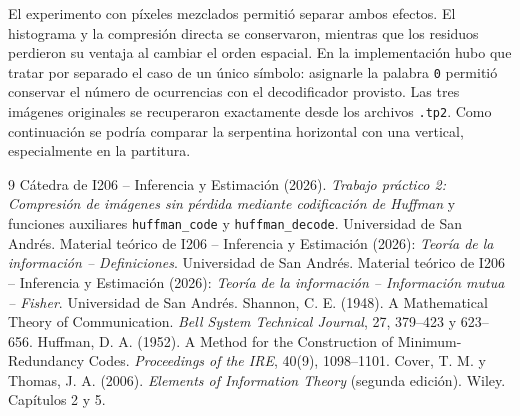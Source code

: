 \documentclass[11pt,a4paper]{article}
\begin{document}
El experimento con píxeles mezclados permitió separar ambos efectos. El histograma y la compresión directa
se conservaron, mientras que los residuos perdieron su ventaja al cambiar el orden espacial. En la
implementación hubo que tratar por separado el caso de un único símbolo: asignarle la palabra
\texttt{0} permitió conservar el número de ocurrencias con el decodificador provisto. Las tres
imágenes originales se recuperaron exactamente desde los archivos \texttt{.tp2}. Como continuación
se podría comparar la serpentina horizontal con una vertical, especialmente en la partitura.

{\small
\begin{thebibliography}{9}
 Cátedra de I206 -- Inferencia y Estimación (2026). \emph{Trabajo práctico 2: Compresión
  de imágenes sin pérdida mediante codificación de Huffman} y funciones auxiliares
  \texttt{huffman\_code} y \texttt{huffman\_decode}. Universidad de San Andrés.
 Material teórico de I206 -- Inferencia y Estimación (2026): \emph{Teoría de la
  información -- Definiciones}. Universidad de San Andrés.
 Material teórico de I206 -- Inferencia y Estimación (2026): \emph{Teoría de la
  información -- Información mutua -- Fisher}. Universidad de San Andrés.
 Shannon, C. E. (1948). A Mathematical Theory of Communication. \emph{Bell System
  Technical Journal}, 27, 379--423 y 623--656.
 Huffman, D. A. (1952). A Method for the Construction of Minimum-Redundancy Codes.
  \emph{Proceedings of the IRE}, 40(9), 1098--1101.
 Cover, T. M. y Thomas, J. A. (2006). \emph{Elements of Information Theory} (segunda
  edición). Wiley. Capítulos 2 y 5.
\end{thebibliography}
}
\end{document}
